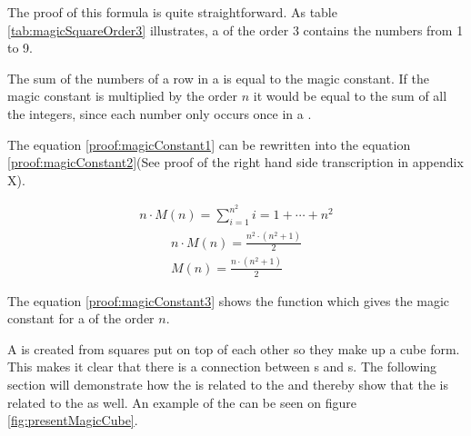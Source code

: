 The proof of this formula is quite straightforward. As table \ref{tab:magicSquareOrder3} illustrates, a \msquare{} of the order 3 contains the numbers from 1 to 9.

The sum of the numbers of a row in a \msquare{} is equal to the magic constant. If the magic constant is multiplied by the order $n$ it would be equal to the sum of all the integers, since each number only occurs once in a \msquare{}.

The equation \ref{proof:magicConstant1} can be rewritten into the equation \ref{proof:magicConstant2}(See proof of the right hand side transcription in appendix X).

\begin{align}
\label{proof:magicConstant1}
	n \cdot M \left( n \right) = \sum ^{n^2}_{i = 1} i = 1 + \cdots + n^2
\end{align}
\begin{align}
\label{proof:magicConstant2}
	n \cdot M \left( n \right) = \frac{n^2 \cdot \left( n^2 + 1 \right)}{2} \\
\label{proof:magicConstant3}
	M \left( n \right) = \frac{n \cdot \left( n^2 + 1 \right)}{2} 
\end{align}

The equation \ref{proof:magicConstant3} shows the function which gives the magic constant for a \msquare{} of the order $n$.


A \mcube{} is created from squares put on top of each other so they make up a cube form. 
This makes it clear that there is a connection between \msquare{}s and \mcube{}s.
The following section will demonstrate how the \mcube{} is related to the \rubik{} and thereby show that the \msquare{} is related to the \rubik{} as well.
An example of the \mcube{} can be seen on figure \ref{fig:presentMagicCube}.